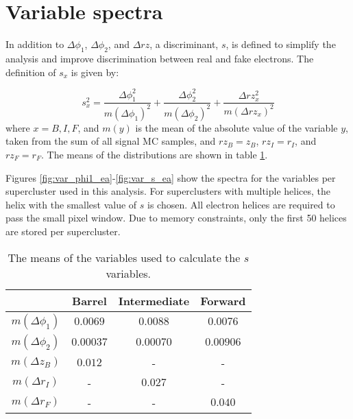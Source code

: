 \section{Variable spectra}

In addition to $\Delta\phi_1$, $\Delta\phi_2$, and $\Delta rz$, a discriminant, $s$, is defined to simplify the analysis and improve discrimination between real and fake electrons.  The definition of $s_x$ is given by:

\begin{equation}
  s_x^2 = \frac{\Delta\phi_1^2}{m(\Delta\phi_1)^2} + \frac{\Delta\phi_2^2}{m(\Delta\phi_2)^2} + \frac{\Delta rz_x^2}{m(\Delta rz_x)^2}
\end{equation}
where $x=B,I,F$, and $m(y)$ is the mean of the absolute value of the variable $y$, taken from the sum of all signal MC samples, and $rz_B=z_B$, $rz_I=r_I$, and $rz_F=r_F$.  The means of the distributions are shown in table \ref{tab:s_parameters}.

Figures \ref{fig:var_phi1_ea}-\ref{fig:var_s_ea} show the spectra for the variables per supercluster used in this analysis.  For superclusters with multiple helices, the helix with the smallest value of $s$ is chosen.  All electron helices are required to pass the small pixel window.  Due to memory constraints, only the first 50 helices are stored per supercluster.

\begin{table}[!hbt]
  \begin{center}
    \begin{tabular}{cccc}
      \hline
                        & Barrel    & Intermediate & Forward  \\
      \hline
      $m(\Delta\phi_1)$ &  $0.0069$ &     $0.0088$ &  $0.0076$ \\
      $m(\Delta\phi_2)$ & $0.00037$ &    $0.00070$ & $0.00906$ \\
      $m(\Delta z_B)$   &   $0.012$ &            - &         - \\
      $m(\Delta r_I)$   &         - &      $0.027$ &         - \\
      $m(\Delta r_F)$   &         - &            - &   $0.040$ \\
      \hline
    \end{tabular}
    \caption{The means of the variables used to calculate the $s$ variables.}
    \label{tab:s_parameters}
  \end{center}
\end{table}


